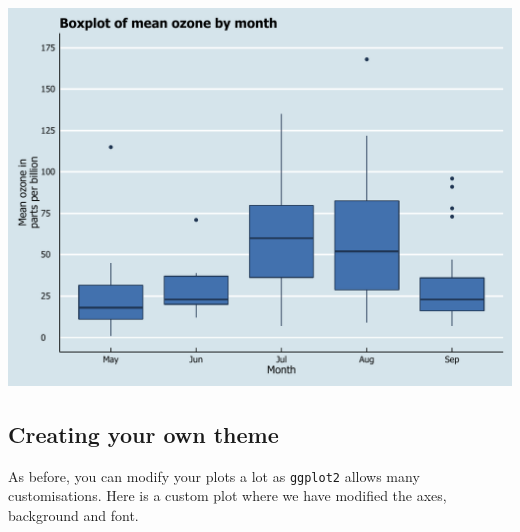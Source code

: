 \documentclass[]{article}
\begin{document}
\begin{center}\includegraphics{0_all_posts_pdf/box_12-1} \end{center}

\subsection{Creating your own theme}\label{creating-your-own-theme-9}

As before, you can modify your plots a lot as \texttt{ggplot2} allows
many customisations. Here is a custom plot where we have modified the
axes, background and font.
\end{document}
